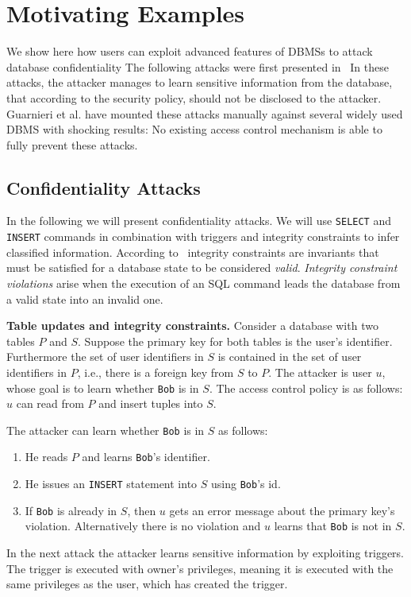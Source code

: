 \section{Motivating Examples}

We show here how users can exploit advanced features of DBMSs to attack database confidentiality
%
The following attacks were first presented in~\cite{guarnieri2016strong}
%
In these attacks, the attacker manages to learn sensitive information from the database, that according to the security policy, should not be disclosed to the attacker.
%
Guarnieri et al. have mounted these attacks manually against several widely used DBMS with shocking results: No existing access control mechanism is able to fully prevent these attacks.

\subsection{Confidentiality Attacks}

In the following we will present confidentiality attacks. 
%
We will use \texttt{SELECT} and \texttt{INSERT} commands in combination with triggers and integrity constraints to infer classified information.
%
According to~\cite{guarnieri2016strong} integrity constraints are invariants that must be satisfied for a database state to be considered \emph{valid}.
%
\emph{Integrity constraint violations} arise when the execution of an SQL command leads the database from a valid state into an invalid one.
%
\begin{attack}
{\bf Table updates and integrity constraints.}
%
Consider a database with two tables $P$ and $S$. 
%
Suppose the primary key for both tables is the user's identifier.
%
Furthermore the set of user identifiers in $S$ is contained in the set of user identifiers in $P$, i.e., there is a foreign key from $S$ to $P$.
%
The attacker is user $u$, whose goal is to learn whether \texttt{Bob} is in $S$.
%
The access control policy is as follows: $u$ can read from $P$ and insert tuples into $S$.

The attacker can learn whether \texttt{Bob} is in $S$ as follows:
\begin{enumerate}
	\item He reads $P$ and learns \texttt{Bob}'s identifier.
	\item He issues an \texttt{INSERT} statement into $S$ using \texttt{Bob}'s id.
	\item If \texttt{Bob} is already in $S$, then $u$ gets an error message about the primary key's violation. Alternatively there is no violation and $u$ learns that \texttt{Bob} is not in $S$.
\end{enumerate}
\end{attack}
%
In the next attack the attacker learns sensitive information by exploiting triggers.
%
The trigger is executed with owner's privileges, meaning it is executed with the same privileges as the user, which has created the trigger.

